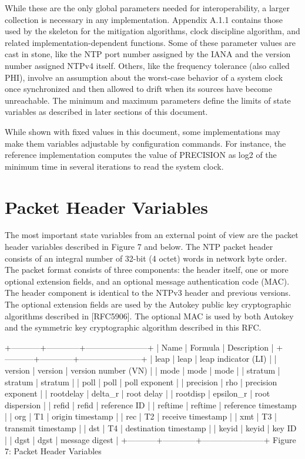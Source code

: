 While these are the only global parameters needed for
interoperability, a larger collection is necessary in any
implementation. Appendix A.1.1 contains those used by the skeleton
for the mitigation algorithms, clock discipline algorithm, and
related implementation-dependent functions. Some of these parameter
values are cast in stone, like the NTP port number assigned by the
IANA and the version number assigned NTPv4 itself. Others, like the
frequency tolerance (also called PHI), involve an assumption about
the worst-case behavior of a system clock once synchronized and then
allowed to drift when its sources have become unreachable. The
minimum and maximum parameters define the limits of state variables
as described in later sections of this document.

While shown with fixed values in this document, some implementations
may make them variables adjustable by configuration commands. For
instance, the reference implementation computes the value of
PRECISION as log2 of the minimum time in several iterations to read
the system clock.

\section{Packet Header Variables}

The most important state variables from an external point of view are
the packet header variables described in Figure 7 and below. The NTP
packet header consists of an integral number of 32-bit (4 octet)
words in network byte order. The packet format consists of three
components: the header itself, one or more optional extension fields,
and an optional message authentication code (MAC). The header
component is identical to the NTPv3 header and previous versions.
The optional extension fields are used by the Autokey public key
cryptographic algorithms described in [RFC5906]. The optional MAC is
used by both Autokey and the symmetric key cryptographic algorithm
described in this RFC.

+-----------+------------+-----------------------+
| Name | Formula | Description |
+-----------+------------+-----------------------+
| leap | leap | leap indicator (LI) |
| version | version | version number (VN) |
| mode | mode | mode |
| stratum | stratum | stratum |
| poll | poll | poll exponent |
| precision | rho | precision exponent |
| rootdelay | delta_r | root delay |
| rootdisp | epsilon_r | root dispersion |
| refid | refid | reference ID |
| reftime | reftime | reference timestamp |
| org | T1 | origin timestamp |
| rec | T2 | receive timestamp |
| xmt | T3 | transmit timestamp |
| dst | T4 | destination timestamp |
| keyid | keyid | key ID |
| dgst | dgst | message digest |
+-----------+------------+-----------------------+
Figure 7: Packet Header Variables

